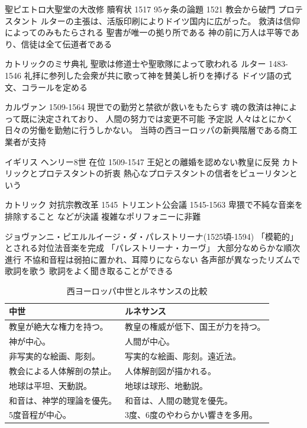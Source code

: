 \documentclass[a4j]{jarticle}
\begin{document}
聖ピエトロ大聖堂の大改修
贖宥状
1517 95ヶ条の論題
1521 教会から破門
プロテスタント
ルターの主張は、活版印刷によりドイツ国内に広がった。
救済は信仰によってのみもたらされる
聖書が唯一の拠り所である
神の前に万人は平等であり、信徒は全て伝道者である

カトリックのミサ典礼
聖歌は修道士や聖歌隊によって歌われる
ルター 1483-1546
礼拝に参列した会衆が共に歌って神を賛美し祈りを捧げる
ドイツ語の式文、コラールを定める

カルヴァン 1509-1564
現世での勤労と禁欲が救いをもたらす
魂の救済は神によって既に決定されており、
人間の努力では変更不可能
予定説
人々はとにかく日々の労働を勤勉に行うしかない。
当時の西ヨーロッパの新興階層である商工業者が支持

イギリス
ヘンリー8世 在位 1509-1547
王妃との離婚を認めない教皇に反発
カトリックとプロテスタントの折衷
熱心なプロテスタントの信者をピューリタンという

カトリック
対抗宗教改革
1545
トリエント公会議 1545-1563
卑猥で不純な音楽を排除すること
などが決議
複雑なポリフォニーに非難

ジョヴァンニ・ピエルルイージ・ダ・パレストリーナ(1525頃-1594)
「模範的」とされる対位法音楽を完成
「パレストリーナ・カーヴ」
大部分なめらかな順次進行
不協和音程は弱拍に置かれ、耳障りにならない
各声部が異なったリズムで歌詞を歌う
歌詞をよく聞き取ることができる


\begin{table}[tb]
 \begin{center}
  \caption{西ヨーロッパ中世とルネサンスの比較}
  \label{tab:comparison}
  \begin{tabular}{|l|l|} \hline
  中世                       & ルネサンス                         \\
  \hline \hline
  教皇が絶大な権力を持つ。   & 教皇の権威が低下、国王が力を持つ。 \\ \hline
  神が中心。                 & 人間が中心。                       \\ \hline
  非写実的な絵画、彫刻。     & 写実的な絵画、彫刻。遠近法。       \\ \hline
  教会による人体解剖の禁止。 & 人体解剖図が描かれる。             \\ \hline
  地球は平坦、天動説。       & 地球は球形、地動説。               \\ \hline
  和音は、神学的理論を優先。 & 和音は、人間の聴覚を優先。         \\
  5度音程が中心。            & 3度、6度のやわらかい響きを多用。   \\ \hline
  \end{tabular}
 \end{center}
\end{table}
\end{document}
